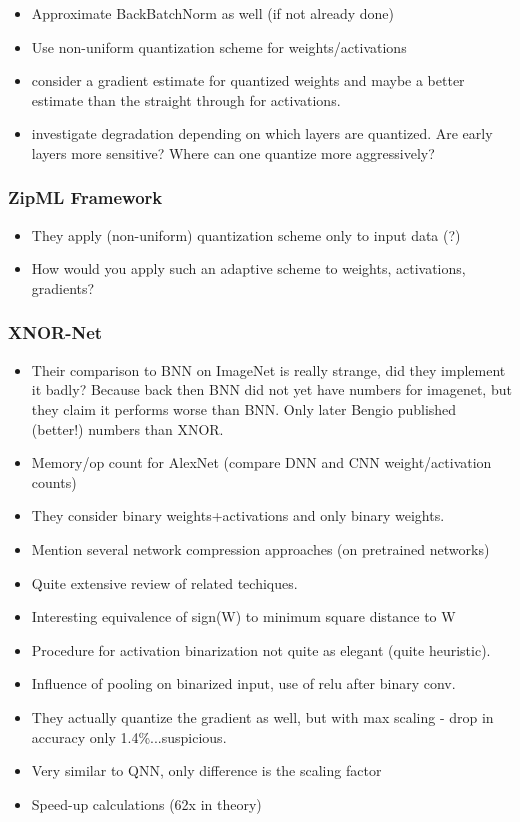 \documentclass{article}
\begin{document}
\begin{itemize}
\begin{itemize}
            \item Approximate BackBatchNorm as well (if not already done)
            \item Use non-uniform quantization scheme for weights/activations
            \item consider a gradient estimate for quantized weights and maybe
            a better estimate than the straight through for activations.
            \item investigate degradation depending on which layers are quantized.
            Are early layers more sensitive? Where can one quantize more aggressively?
        \end{itemize}
    \end{itemize}


\subsubsection*{ZipML Framework}
\begin{itemize}
    \item They apply (non-uniform) quantization scheme only to input data (?)
    \item How would you apply such an adaptive scheme to weights, activations, gradients?
\end{itemize}

\subsubsection*{XNOR-Net}
\begin{itemize}
    \item Their comparison to BNN on ImageNet is really strange, did they implement it
    badly? Because back then BNN did not yet have numbers for imagenet, but they claim
    it performs worse than BNN. Only later Bengio published (better!) numbers than XNOR.
    \item Memory/op count for AlexNet (compare DNN and CNN weight/activation counts)
    \item They consider binary weights+activations and only binary weights.
    \item Mention several network compression approaches (on pretrained networks)
    \item Quite extensive review of related techiques.
    \item Interesting equivalence of sign(W) to minimum square distance to W
    \item Procedure for activation binarization not quite as elegant (quite heuristic).
    \item Influence of pooling on binarized input, use of relu after binary conv.
    \item They actually quantize the gradient as well, but with max scaling - drop
    in accuracy only 1.4\%...suspicious.
    \item Very similar to QNN, only difference is the scaling factor
    \item Speed-up calculations (62x in theory)
\end{itemize}
\end{document}
